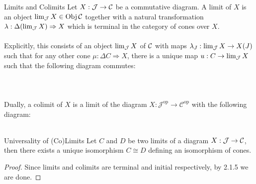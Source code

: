 \documentclass[a4paper]{article}
\begin{document}
\begin{defn}{Limits and Colimits}{} Let $X:\mathcal{J}\to\mathcal{C}$ be a commutative diagram. A limit of $X$ is an object $\lim_{\mathcal{J}} X\in\operatorname{Obj}\mathcal{C}$ together with a natural transformation $\lambda:\Delta(\lim_{\mathcal{J}} X)\Rightarrow X$ which is terminal in the category of cones over $X$. \\~\\
Explicitly, this consists of an object $\lim_{\mathcal{J}} X$ of $\mathcal{C}$ with maps $\lambda_J:\lim_{\mathcal{J}} X\to X(J)$ such that for any other cone $\mu:\Delta C\Rightarrow X$, there is a unique map $u:C\to\lim_{\mathcal{J}} X$ such that the following diagram commutes: \\~\\
\\~\\

Dually, a colimit of $X$ is a limit of the diagram $X:\mathcal{J}^{\text{op}}\to\mathcal{C}^{\text{op}}$ with the following diagram: \\~\\
\end{defn}

\begin{thm}{Universality of (Co)Limits}{} Let $C$ and $D$ be two limits of a diagram $X:\mathcal{J}\to\mathcal{C}$, then there exists a unique isomorphism $C\cong D$ defining an isomorphism of cones. \tcbline
\begin{proof}
Since limits and colimits are terminal and initial respectively, by 2.1.5 we are done. 
\end{proof}
\end{thm}
\end{document}
